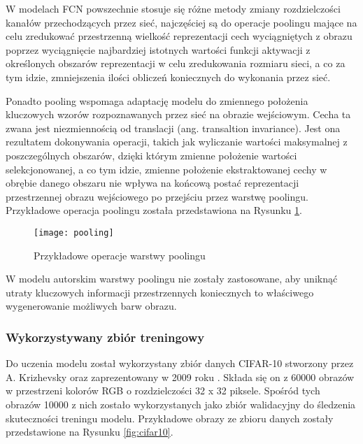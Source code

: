   W modelach FCN powszechnie stosuje się różne metody zmiany rozdzielczości
  kanałów przechodzących przez sieć, najczęściej są do operacje poolingu mające
  na celu zredukować przestrzenną wielkość reprezentacji cech wyciągniętych z
  obrazu poprzez wyciągnięcie najbardziej istotnych wartości funkcji aktywacji z
  określonych obszarów reprezentacji w celu zredukowania rozmiaru
  sieci, a co za tym idzie, zmniejszenia ilości obliczeń koniecznych do wykonania
  przez sieć.

  Ponadto pooling wspomaga adaptację modelu do zmiennego położenia
  kluczowych wzorów rozpoznawanych przez sieć na obrazie wejściowym. Cecha ta
  zwana jest niezmiennością od translacji (ang. transaltion invariance). Jest
  ona rezultatem dokonywania operacji, takich jak wyliczanie wartości maksymalnej
  z poszczególnych obszarów, dzięki którym zmienne położenie wartości
  selekcjonowanej, a co tym idzie, zmienne położenie ekstraktowanej cechy w obrębie
  danego obszaru nie wpływa na końcową postać reprezentacji przestrzennej obrazu
  wejściowego po przejściu przez warstwę poolingu. Przykładowe operacja poolingu
  została przedstawiona na Rysunku \ref{fig:pooling}.

  \begin{figure}[h]
   \centering
   \captionsetup{justification=centering}
   \texttt{[image: pooling]}
   \caption[Przykładowe operacje warstwy poolingu - źródło: Rysunek własny]{Przykładowe operacje warstwy poolingu}
   \label{fig:pooling}
  \end{figure}

  \noindent
  W modelu autorskim warstwy poolingu nie zostały zastosowane, aby uniknąć utraty
  kluczowych informacji przestrzennych koniecznych to właściwego wygenerowanie
  możliwych barw obrazu.

\subsubsection{Wykorzystywany zbiór treningowy}

  Do uczenia modelu został wykorzystany zbiór danych CIFAR-10 stworzony przez
  A. Krizhevsky oraz zaprezentowany w 2009 roku \cite{cifar-10}.
  Składa się on z 60000 obrazów w przestrzeni kolorów RGB o rozdzielczości 32 x 32 piksele.
  Spośród tych obrazów 10000 z nich zostało wykorzystanych jako zbiór
  walidacyjny do śledzenia skuteczności treningu modelu. Przykładowe obrazy
  ze zbioru danych zostały przedstawione na Rysunku \ref{fig:cifar10}.

